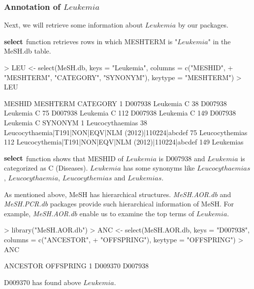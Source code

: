 \documentclass[11pt]{article}
\newcommand{\Rpackage}[1]{{\textit{#1}}}
\begin{document}
\newpage
\subsubsection{Annotation of $Leukemia$}
Next, we will retrieve some information about $Leukemia$ by our packages.

$\bf{select}$ function retrieves rows in which MESHTERM is "$Leukemia$" in the MeSH.db table.
\begin{center}
\begin{Schunk}
\begin{Sinput}
> LEU <- select(MeSH.db, keys = "Leukemia", columns = c("MESHID", 
+     "MESHTERM", "CATEGORY", "SYNONYM"), keytype = "MESHTERM")
> LEU
\end{Sinput}
\begin{Soutput}
     MESHID MESHTERM CATEGORY
1   D007938 Leukemia        C
38  D007938 Leukemia        C
75  D007938 Leukemia        C
112 D007938 Leukemia        C
149 D007938 Leukemia        C
                                                 SYNONYM
1                                        Leucocythaemias
38  Leucocythaemia|T191|NON|EQV|NLM (2012)|110224|abcdef
75                                        Leucocythemias
112  Leucocythemia|T191|NON|EQV|NLM (2012)|110224|abcdef
149                                            Leukemias
\end{Soutput}
\end{Schunk}
\end{center}

$\bf{select}$ function shows that MESHID of $Leukemia$ is D007938 and $Leukemia$ is categorized as C (Diseases). $Leukemia$ has some synonyms like $Leucocythaemias$, $Leucocythaemia$, $Leucocythemias$ and $Leukemias$.

As mentioned above, MeSH has hierarchical structures. \Rpackage{MeSH.AOR.db} and \Rpackage{MeSH.PCR.db} packages provide such hierarchical information of MeSH. For example, \Rpackage{MeSH.AOR.db} enable us to examine the top terms of $Leukemia$.

\begin{center}
\begin{Schunk}
\begin{Sinput}
> library("MeSH.AOR.db")
> ANC <- select(MeSH.AOR.db, keys = "D007938", columns = c("ANCESTOR", 
+     "OFFSPRING"), keytype = "OFFSPRING")
> ANC
\end{Sinput}
\begin{Soutput}
  ANCESTOR OFFSPRING
1  D009370   D007938
\end{Soutput}
\end{Schunk}
\end{center}
D009370 has found above $Leukemia$.\\
\end{document}
